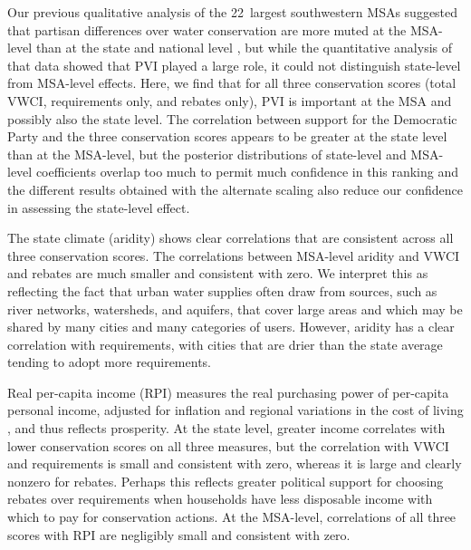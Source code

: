 \documentclass[draft,linenumbers]{agujournal}\usepackage{knitr}
\begin{document}

Our previous qualitative analysis of the 22~largest southwestern MSAs suggested
that partisan differences over water conservation are more muted at the
MSA-level than at the state and national level \citep{hess:drought:2016}, but
while the quantitative analysis of that data showed that PVI played a large
role, it could not distinguish state-level from MSA-level effects.
Here, we find that for all three conservation scores (total VWCI, requirements
only, and rebates only), PVI is important at the MSA and possibly also the state level.
The correlation between
support for the Democratic Party
and the three conservation scores appears to be
greater at the state level than at the MSA-level, but the posterior
distributions of state-level and MSA-level coefficients overlap too much to
permit much confidence in this ranking and the different results obtained
with the alternate scaling also reduce our confidence in assessing the state-level
effect.

The state climate (aridity) shows clear
correlations
that are consistent across all three conservation scores.
The
correlations between
MSA-level aridity
and
VWCI and rebates are much
smaller
and consistent with zero.
We interpret this as reflecting the fact that urban water supplies often draw from
sources, such as river networks, watersheds, and aquifers, that cover large areas
and which may be shared by many cities and many categories of users.
However, aridity has a clear
correlation with
requirements, with cities that are
drier than the state average tending to adopt more requirements.

Real per-capita income (RPI) measures the real purchasing power of
per-capita personal income, adjusted for inflation and regional variations in the
cost of living
\citep{bea:rpp.methodology:2016}, and thus reflects prosperity.
At the state level, greater income correlates with lower conservation scores on
all three measures, but the
correlation with VWCI and requirements
is small and
consistent with zero,
whereas it is large and clearly nonzero for rebates.
Perhaps this reflects greater political support for choosing rebates over
requirements when households have less disposable income with which to pay for
conservation actions.
At the MSA-level,
correlations of all three scores with RPI
are negligibly small and
consistent with zero.
\end{document}
